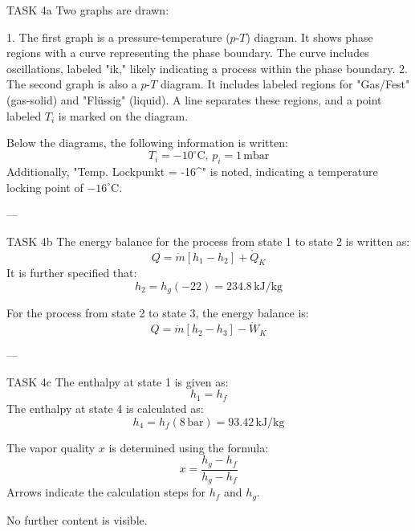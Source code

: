 TASK 4a  
Two graphs are drawn:  

1. The first graph is a pressure-temperature (\( p \)-\( T \)) diagram. It shows phase regions with a curve representing the phase boundary. The curve includes oscillations, labeled "ik," likely indicating a process within the phase boundary.  
2. The second graph is also a \( p \)-\( T \) diagram. It includes labeled regions for "Gas/Fest" (gas-solid) and "Flüssig" (liquid). A line separates these regions, and a point labeled \( T_i \) is marked on the diagram.  

Below the diagrams, the following information is written:  
\[
T_i = -10^\circ\text{C}, \, p_i = 1 \, \text{mbar}
\]  
Additionally, "Temp. Lockpunkt = -16^\circ{}" is noted, indicating a temperature locking point of \(-16^\circ\text{C}\).  

---

TASK 4b  
The energy balance for the process from state 1 to state 2 is written as:  
\[
Q = \dot{m} \left[ h_1 - h_2 \right] + \dot{Q}_K
\]  
It is further specified that:  
\[
h_2 = h_g(-22) = 234.8 \, \text{kJ/kg}
\]  

For the process from state 2 to state 3, the energy balance is:  
\[
Q = \dot{m} \left[ h_2 - h_3 \right] - \dot{W}_K
\]  

---

TASK 4c  
The enthalpy at state 1 is given as:  
\[
h_1 = h_f
\]  
The enthalpy at state 4 is calculated as:  
\[
h_4 = h_f(8 \, \text{bar}) = 93.42 \, \text{kJ/kg}
\]  

The vapor quality \( x \) is determined using the formula:  
\[
x = \frac{h_g - h_f}{h_g - h_f}
\]  
Arrows indicate the calculation steps for \( h_f \) and \( h_g \).  

No further content is visible.
